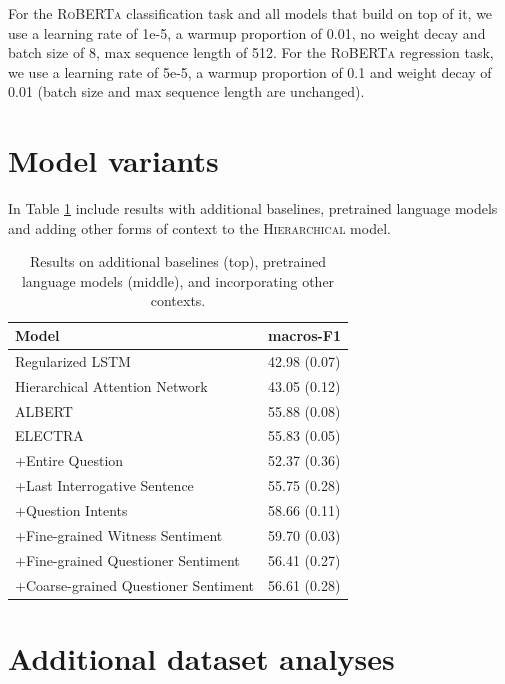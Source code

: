 For the \textsc{RoBERTa} classification task and all models that build on top of it, we use a learning rate of 1e-5, a warmup proportion of 0.01, no weight decay and batch size of 8, max sequence length of 512. For the \textsc{RoBERTa} regression task, we use a learning rate of 5e-5, a warmup proportion of 0.1 and weight decay of 0.01 (batch size and max sequence length are unchanged).

\section{Model variants}
\label{sec:app_variants}

In Table \ref{tab:other_models} include results with additional baselines, pretrained language models and adding other forms of context to the \textsc{Hierarchical} model.

\begin{table}[t]
\centering
\small
\begin{tabular}{ll}
\toprule
Model & macros-F1\\
\midrule
Regularized LSTM &42.98 (0.07) \\
Hierarchical Attention Network &43.05 (0.12)\\
\midrule
ALBERT &55.88 (0.08)\\
ELECTRA &55.83 (0.05)\\
\midrule
+Entire Question &52.37 (0.36)\\
+Last Interrogative Sentence &55.75 (0.28) \\
+Question Intents &58.66 (0.11)\\
+Fine-grained Witness Sentiment &59.70 (0.03)\\
+Fine-grained Questioner Sentiment &56.41 (0.27)\\
+Coarse-grained Questioner Sentiment &56.61 (0.28)\\
\bottomrule
\end{tabular}
\caption{Results on additional baselines (top), pretrained language models (middle), and incorporating other contexts.}
\label{tab:other_models}
\end{table}

\section{Additional dataset analyses}
\label{sec:app_lmi}

